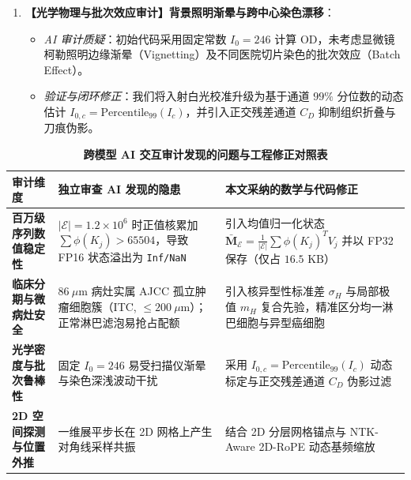\documentclass[10pt,twocolumn,a4paper]{ctexart}
\begin{document}
\begin{enumerate}
\begin{itemize}
        \item \emph{验证与闭环修正}：我们在先验公式中强化了反映恶性细胞核多形性（Pleomorphism）的局部标准差项 $\sigma_H(i)$ 与核质比峰值项 $m_H(i)$（权重占 $50\%$），并在正文中严格区分了微转移灶与 ITC 的物理尺度定义。
    \end{itemize}
    \item \textbf{【光学物理与批次效应审计】背景照明渐晕与跨中心染色漂移}：
    \begin{itemize}
        \item \emph{AI 审计质疑}：初始代码采用固定常数 $I_0 = 246$ 计算 OD，未考虑显微镜柯勒照明边缘渐晕（Vignetting）及不同医院切片染色的批次效应（Batch Effect）。
        \item \emph{验证与闭环修正}：我们将入射白光校准升级为基于通道 $99\%$ 分位数的动态估计 $I_{0,c} = \text{Percentile}_{99}(I_c)$，并引入正交残差通道 $C_D$ 抑制组织折叠与刀痕伪影。
    \end{itemize}
\end{enumerate}

\begin{table}[!h]
    \centering
    \caption{\textbf{跨模型 AI 交互审计发现的问题与工程修正对照表}}
    \label{tab:audit}
    \scriptsize
    \renewcommand{\arraystretch}{1.10}
    \setlength{\tabcolsep}{3.5pt}
    \begin{tabular}{p{1.55cm}p{2.65cm}p{3.05cm}}
        \toprule
        \textbf{审计维度} & \textbf{独立审查 AI 发现的隐患} & \textbf{本文采纳的数学与代码修正} \\
        \midrule
        \textbf{百万级序列数值稳定性} & $|\mathcal{E}|=1.2\times 10^6$ 时正值核累加 $\sum \phi(K_j) > 65504$，导致 FP16 状态溢出为 \texttt{Inf/NaN} & 引入均值归一化状态 $\bar{\mathbf{M}}_{\mathcal{E}} = \frac{1}{|\mathcal{E}|}\sum \phi(K_j)^T V_j$ 并以 FP32 保存（仅占 $16.5\text{ KB}$） \\
        \midrule
        \textbf{临床分期与微病灶安全} & $86\ \mu\text{m}$ 病灶实属 AJCC 孤立肿瘤细胞簇（ITC, $\le 200\ \mu\text{m}$）；正常淋巴滤泡易抢占配额 & 引入核异型性标准差 $\sigma_H$ 与局部极值 $m_H$ 复合先验，精准区分均一淋巴细胞与异型癌细胞 \\
        \midrule
        \textbf{光学密度与批次鲁棒性} & 固定 $I_0=246$ 易受扫描仪渐晕与染色深浅波动干扰 & 采用 $I_{0,c}=\text{Percentile}_{99}(I_c)$ 动态标定与正交残差通道 $C_D$ 伪影过滤 \\
        \midrule
        \textbf{2D 空间探测与位置外推} & 一维展平步长在 2D 网格上产生对角线采样共振 & 结合 2D 分层网格锚点与 NTK-Aware 2D-RoPE 动态基频缩放 \\
        \bottomrule
    \end{tabular}
\end{table}
\end{document}
